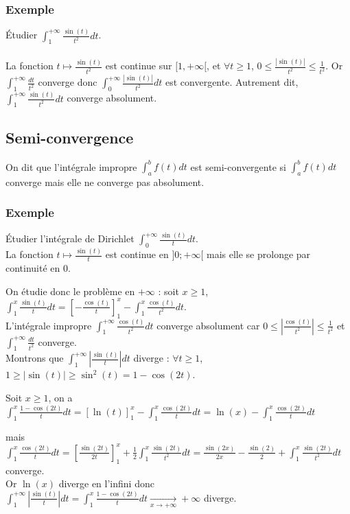 \documentclass[a4paper,10pt]{book} %
\newcommand{\abs}[1]{\left|#1\right|}
\newcommand{\displayAmath}{\displaystyle}
\begin{document}
\subsubsection{Exemple}
Étudier $\displayAmath\int_1^{+\infty}\frac{\sin(t)}{t^2}dt$.\\\\
La fonction $t\mapsto \frac{\sin(t)}{t^2}$ est continue sur $[1,+\infty[$, et $\forall t\geq 1$, $0\leq \frac{\abs{\sin(t)}}{t^2}\leq \frac{1}{t^2}$.
Or $\displayAmath\int_1^{+\infty}\frac{dt}{t^2}$ converge donc $\displayAmath\int_0^{+\infty}\frac{\abs{\sin(t)}}{t^2}dt$ est convergente.
Autrement dit, $\displayAmath\int_1^{+\infty}\frac{\sin(t)}{t^2}dt$ converge absolument.

\subsection{Semi-convergence}
On dit que l'intégrale impropre $\displayAmath\int_a^bf(t)dt$ est semi-convergente si $\displayAmath\int_a^bf(t)dt$ converge mais elle ne converge pas absolument.

\subsubsection{Exemple}
Étudier l'intégrale de Dirichlet $\displayAmath\int_0^{+\infty}\frac{\sin(t)}{t}dt$.\\
La fonction $t\mapsto \frac{\sin(t)}{t}$ est continue en $]0;+\infty[$ mais elle se prolonge par continuité en 0.

On étudie donc le problème en $+\infty$ : 
soit $x\geq 1$, $\displayAmath\int_1^x\frac{\sin(t)}{t}dt= \left[-\frac{\cos(t)}{t}\right]_1^x-\int_1^x\frac{\cos(t)}{t^2}dt$.\\
L'intégrale impropre $\displayAmath\int_1^{+\infty} \frac{\cos(t)}{t^2}dt$ converge absolument car $0\leq \abs{\frac{\cos(t)}{t^2}}\leq \frac{1}{t^2}$ et $\displayAmath\int_1^{+\infty} \frac{dt}{t^2}$ converge.\\
Montrons que $\displayAmath\int_1^{+\infty}\abs{\frac{\sin(t)}{t}}dt$ diverge : $\forall t\geq 1$, $1\geq \abs{\sin(t)}\geq \sin^2(t)=1-\cos(2t)$.

Soit $x\geq 1$, on a $\displayAmath\int_1^x \frac{1-\cos(2t)}{t}dt=[\ln(t)]_1^x-\int_1^x\frac{\cos(2t)}{t}dt= \ln(x)-\int_1^x\frac{\cos(2t)}{t}dt$

mais $\displayAmath\int_1^x\frac{\cos(2t)}{t}dt=\left[\frac{\sin(2t)}{2t}\right]_1^x+\frac{1}{2}\int_1^x\frac{\sin(2t)}{t^2}dt= \frac{\sin(2x)}{2x}-\frac{\sin(2)}{2}+\int_1^x\frac{\sin(2t)}{t^2}dt$ converge.\\
Or $\ln(x)$ diverge en l'infini donc $\displayAmath\int_1^{+\infty}\abs{\frac{\sin(t)}{t}}dt=\int_1^x\frac{1-\cos(2t)}{t}dt\underset{x\rightarrow +\infty}{\rightarrow}+\infty$ diverge.
\end{document}
